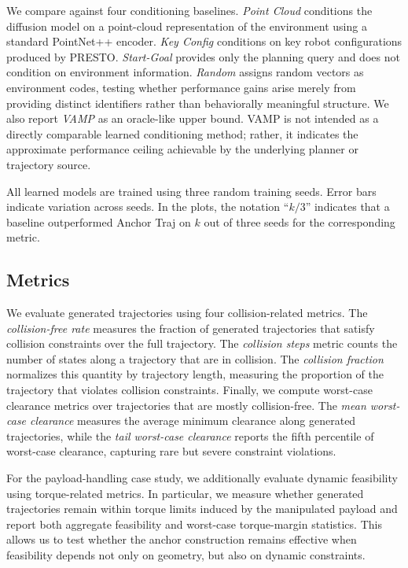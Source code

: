 We compare against four conditioning baselines. \textit{Point Cloud} conditions the diffusion model on a point-cloud representation of the environment using a standard PointNet++ encoder. \textit{Key Config} conditions on key robot configurations produced by PRESTO. \textit{Start-Goal} provides only the planning query and does not condition on environment information. \textit{Random} assigns random vectors as environment codes, testing whether performance gains arise merely from providing distinct identifiers rather than behaviorally meaningful structure. We also report \textit{VAMP} as an oracle-like upper bound. VAMP is not intended as a directly comparable learned conditioning method; rather, it indicates the approximate performance ceiling achievable by the underlying planner or trajectory source.

All learned models are trained using three random training seeds. Error bars indicate variation across seeds. In the plots, the notation ``$k/3$'' indicates that a baseline outperformed Anchor Traj on $k$ out of three seeds for the corresponding metric.

\subsection{Metrics}

We evaluate generated trajectories using four collision-related metrics. The \textit{collision-free rate} measures the fraction of generated trajectories that satisfy collision constraints over the full trajectory. The \textit{collision steps} metric counts the number of states along a trajectory that are in collision. The \textit{collision fraction} normalizes this quantity by trajectory length, measuring the proportion of the trajectory that violates collision constraints. Finally, we compute worst-case clearance metrics over trajectories that are mostly collision-free. The \textit{mean worst-case clearance} measures the average minimum clearance along generated trajectories, while the \textit{tail worst-case clearance} reports the fifth percentile of worst-case clearance, capturing rare but severe constraint violations.

For the payload-handling case study, we additionally evaluate dynamic feasibility using torque-related metrics. In particular, we measure whether generated trajectories remain within torque limits induced by the manipulated payload and report both aggregate feasibility and worst-case torque-margin statistics. This allows us to test whether the anchor construction remains effective when feasibility depends not only on geometry, but also on dynamic constraints.

